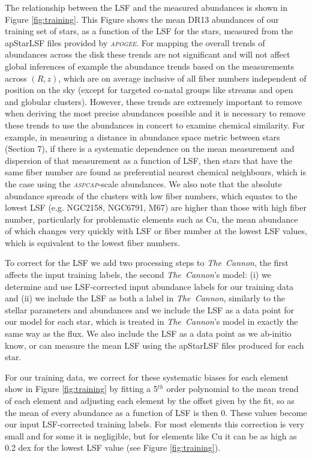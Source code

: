 \documentclass[14pt, preprint2]{aastex6}
\newcommand{\project}[1]{\textsl{#1}}
\newcommand{\tc}{\project{The~Cannon}}
\newcommand{\apogee}{\project{\textsc{apogee}}}
\newcommand{\aspcap}{\project{\textsc{aspcap}}}
\begin{document}
The relationship between the LSF and the measured abundances is shown in Figure \ref{fig:training}. This Figure shows the mean DR13 abundances of our training set of stars,  as a function of the LSF for the stars, measured from the apStarLSF files provided by \apogee. For mapping the overall trends of abundances across the disk these trends are not significant and will not affect global inferences of example the abundance trends based on the measurements across $(R,z)$, which are on average inclusive of all fiber numbers independent of position on the sky (except for targeted co-natal groups like streams and open and globular clusters). However, these trends are extremely important to remove when deriving the most precise abundances possible and it is necessary to remove these trends to use the abundances in concert to examine chemical similarity. For example, in measuring a distance in abundance space metric between stars (Section 7), if there is a systematic dependence on the mean measurement and dispersion of that measurement as a function of LSF, then stars that have the same fiber number are found as preferential nearest chemical neighbours, which is the case using the \aspcap-scale abundances. We also note that the absolute abundance spreads of the clusters with low fiber numbers, which equates to the lowest LSF (e.g. NGC2158, NGC6791, M67) are higher than those with high fiber number,  particularly for problematic elements such as Cu, the mean abundance of which  changes very quickly with LSF or fiber number at the lowest LSF values, which is equivalent to the lowest fiber numbers. 

To correct for the LSF we add two processing steps to \tc,  the first affects the input training labels, the second \tc's model: (i) we determine and use LSF-corrected input abundance labels for our training data and (ii) we include the LSF as both a label in \tc, similarly to the stellar parameters and abundances and we include the LSF as a data point for our model for each star, which is treated in \tc's model in exactly the same way as the flux.  We also include the LSF as a data point as we ab-initio know, or can measure the mean LSF using the apStarLSF files produced for each star. 

For our training data, we correct for these systematic biases for each element show in Figure \ref{fig:training} by fitting a 5$^{th}$ order polynomial to the mean trend of each element and adjusting each element by the offset given by the fit, so as the mean of every abundance as a function of LSF is then 0. These values become our input LSF-corrected training labels.  For most elements this correction is very small and for some it is negligible, but for elements like Cu it can be as high as 0.2 dex for the lowest LSF value (see Figure \ref{fig:training}). 
\end{document}
